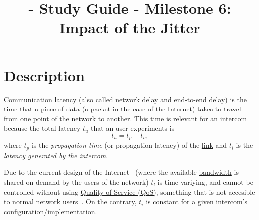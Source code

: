 
\title{\TM - Study Guide - Milestone 6: Impact of the Jitter}

\maketitle

\section{Description}

\href{https://en.wikipedia.org/wiki/Latency_(engineering)#Communication_latency}{Communication
  latency} (also called
\href{https://en.wikipedia.org/wiki/Network_delay}{network delay} and
\href{https://en.wikipedia.org/wiki/End-to-end_delay}{end-to-end
  delay}) is the time that a piece of data (a
\href{https://en.wikipedia.org/wiki/Network_packet}{packet} in the
case of the Internet) takes to travel from one point of the network to
another. This time is relevant for an intercom because the total
latency $t_u$ that an user experiments is
\begin{equation}
  t_u = t_p + t_i,
  \label{eq:user_latency}
\end{equation}
where $t_p$ is the \emph{propagation time} (or propagation latency) of
the \href{https://en.wikipedia.org/wiki/Telecommunications_link}{link}
and $t_i$ is the \emph{latency generated by the intercom}.

Due to the current design of the Internet~\cite{Tanenbaum,Stallings} (where the
available
\href{https://en.wikipedia.org/wiki/Bandwidth_(computing)}{bandwidth}
is shared on demand by the users of the network) $t_l$ is
time-variying, and cannot be controlled without using
\href{https://en.wikipedia.org/wiki/Quality_of_service}{Quality of
  Service (QoS)}, something that is not accesible to normal network
users~\cite{dordal2020intro}. On the contrary, $t_i$ is constant for a
given intercom's configuration/implementation.


